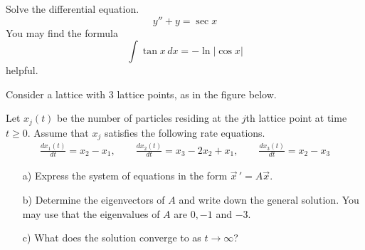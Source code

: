 \documentclass[12pt]{exam}
\begin{document}
    


\newpage


\begin{questions}


    \question[10]  Solve the differential equation. $$y''+y = \sec x$$
    You may find the formula $$\int \tan x \, dx = - \ln |\cos x|$$ helpful. 
    \newpage

        \question[9] Consider a lattice with $3$ lattice points, as in the figure below. 
    
        \begin{center}
        \end{center}  
        
        Let $x_j(t)$ be the number of particles residing at the $j$th lattice point at time $t \ge 0$. Assume that $x_j$ satisfies the following rate equations.
        \begin{align*} 
            \frac{dx_1(t)}{dt} = x_2 - x_1 , \qquad 
            \frac{dx_2(t)}{dt} = x_3 - 2 x_2 + x_1 , \qquad \frac{dx_3(t)}{dt} = x_2 - x_3
        \end{align*} 
        \begin{enumerate} 
            \item[a)] Express the system of equations in the form $\vec x \, ' = A \vec x$. 
                \vspace{2cm}

                \item[b)] Determine the eigenvectors of $A$ and write down the general solution. You may use that the eigenvalues of $A$ are $0, -1$ and $-3$. 
                \vspace{10cm} 
                \item[c)] What does the solution converge to as $t \to \infty$? 
        \end{enumerate}



\end{questions}
\end{document}
